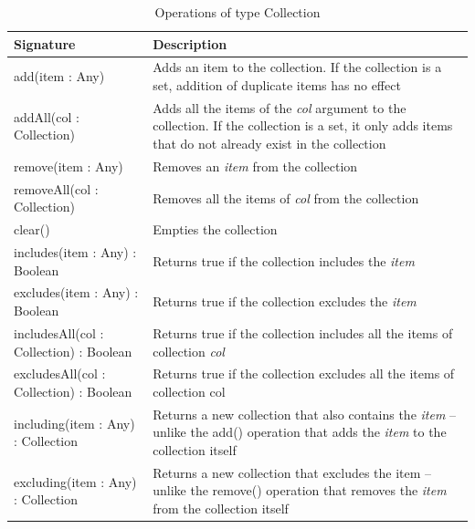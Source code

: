 \begin{longtable} {|p{5.5cm}|p{6.5cm}|}
			
			\caption{Operations of type Collection}
			\label{tab:Collection Operations}\\
			
			\hline
							
			\textbf{Signature} & \textbf{Description} \\\hline

			add(item : Any) & Adds an item to the collection. If the collection is a set, addition of duplicate items has no effect \\\hline
			
			addAll(col : Collection) & Adds all the items of the \emph{col} argument to the collection. If the collection is a set, it only adds items that do not already exist in the collection\\\hline
		
			remove(item : Any) & Removes an \emph{item} from the collection \\\hline
			
			removeAll(col : Collection) & Removes all the items of \emph{col} from the collection \\\hline
			
			clear() & Empties the collection \\\hline
			
			includes(item : Any) : Boolean & Returns true if the collection includes the \emph{item} \\\hline
			
			excludes(item : Any) : Boolean & Returns true if the collection excludes the \emph{item} \\\hline
			
			includesAll(col : Collection) : Boolean & Returns true if the collection includes all the items of collection \emph{col} \\\hline
			
			excludesAll(col : Collection) : Boolean & Returns true if the collection excludes all the items of collection col \\\hline
			
			including(item : Any) : Collection & Returns a new collection that also contains the \emph{item} -- unlike the add() operation that adds the \emph{item} to the collection itself  \\\hline
			
			excluding(item : Any) : Collection & Returns a new collection that excludes the item -- unlike the remove() operation that removes the \emph{item} from the collection itself\\\hline
			

\end{longtable}
